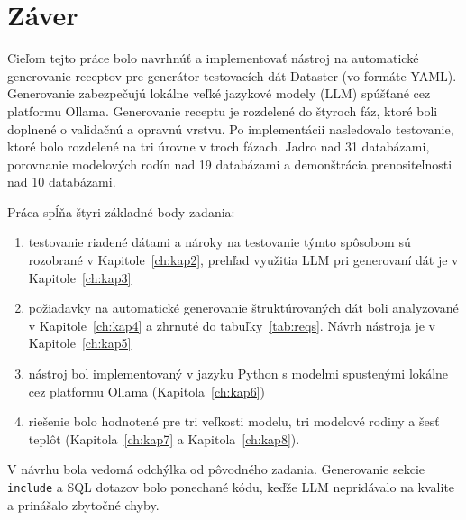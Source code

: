 

\chapter{Záver}
\label{ch:kap10}

Cieľom tejto práce bolo navrhnúť a implementovať nástroj na automatické generovanie receptov pre generátor testovacích dát Dataster (vo formáte YAML). Generovanie zabezpečujú lokálne veľké jazykové modely (LLM) spúšťané cez platformu Ollama. Generovanie receptu je rozdelené do štyroch fáz, ktoré boli doplnené o validačnú a opravnú vrstvu. Po implementácii nasledovalo testovanie, ktoré bolo rozdelené na tri úrovne v troch fázach. Jadro nad 31 databázami, porovnanie modelových rodín nad 19 databázami a demonštrácia prenositeľnosti nad 10 databázami.


Práca spĺňa štyri základné body zadania:
\begin{enumerate}
    \item testovanie riadené dátami a nároky na testovanie týmto spôsobom sú rozobrané v Kapitole~\ref{ch:kap2}, prehľad využitia LLM pri generovaní dát je v Kapitole~\ref{ch:kap3}
    
    \item požiadavky na automatické generovanie štruktúrovaných dát boli analyzované v Kapitole~\ref{ch:kap4} a zhrnuté do tabuľky~\ref{tab:reqs}. Návrh nástroja je v Kapitole~\ref{ch:kap5}
    
    \item nástroj bol implementovaný v jazyku Python s modelmi spustenými lokálne cez platformu Ollama (Kapitola~\ref{ch:kap6})

    \item riešenie bolo hodnotené pre tri veľkosti modelu, tri modelové rodiny a šesť teplôt (Kapitola~\ref{ch:kap7} a Kapitola~\ref{ch:kap8}). 
\end{enumerate}

V návrhu bola vedomá odchýlka od pôvodného zadania. Generovanie sekcie \texttt{include} a SQL dotazov bolo ponechané kódu, keďže LLM nepridávalo na kvalite a prinášalo zbytočné chyby.

